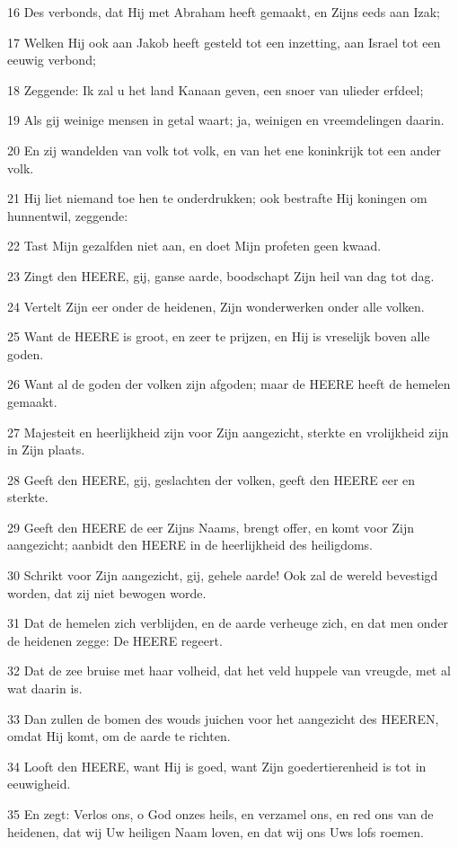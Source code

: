 \par 16 Des verbonds, dat Hij met Abraham heeft gemaakt, en Zijns eeds aan Izak;
\par 17 Welken Hij ook aan Jakob heeft gesteld tot een inzetting, aan Israel tot een eeuwig verbond;
\par 18 Zeggende: Ik zal u het land Kanaan geven, een snoer van ulieder erfdeel;
\par 19 Als gij weinige mensen in getal waart; ja, weinigen en vreemdelingen daarin.
\par 20 En zij wandelden van volk tot volk, en van het ene koninkrijk tot een ander volk.
\par 21 Hij liet niemand toe hen te onderdrukken; ook bestrafte Hij koningen om hunnentwil, zeggende:
\par 22 Tast Mijn gezalfden niet aan, en doet Mijn profeten geen kwaad.
\par 23 Zingt den HEERE, gij, ganse aarde, boodschapt Zijn heil van dag tot dag.
\par 24 Vertelt Zijn eer onder de heidenen, Zijn wonderwerken onder alle volken.
\par 25 Want de HEERE is groot, en zeer te prijzen, en Hij is vreselijk boven alle goden.
\par 26 Want al de goden der volken zijn afgoden; maar de HEERE heeft de hemelen gemaakt.
\par 27 Majesteit en heerlijkheid zijn voor Zijn aangezicht, sterkte en vrolijkheid zijn in Zijn plaats.
\par 28 Geeft den HEERE, gij, geslachten der volken, geeft den HEERE eer en sterkte.
\par 29 Geeft den HEERE de eer Zijns Naams, brengt offer, en komt voor Zijn aangezicht; aanbidt den HEERE in de heerlijkheid des heiligdoms.
\par 30 Schrikt voor Zijn aangezicht, gij, gehele aarde! Ook zal de wereld bevestigd worden, dat zij niet bewogen worde.
\par 31 Dat de hemelen zich verblijden, en de aarde verheuge zich, en dat men onder de heidenen zegge: De HEERE regeert.
\par 32 Dat de zee bruise met haar volheid, dat het veld huppele van vreugde, met al wat daarin is.
\par 33 Dan zullen de bomen des wouds juichen voor het aangezicht des HEEREN, omdat Hij komt, om de aarde te richten.
\par 34 Looft den HEERE, want Hij is goed, want Zijn goedertierenheid is tot in eeuwigheid.
\par 35 En zegt: Verlos ons, o God onzes heils, en verzamel ons, en red ons van de heidenen, dat wij Uw heiligen Naam loven, en dat wij ons Uws lofs roemen.
